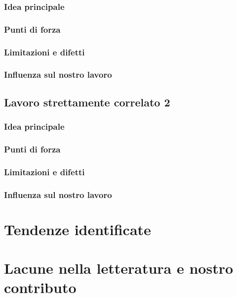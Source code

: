 \subsubsection{Idea principale}
\subsubsection{Punti di forza}
\subsubsection{Limitazioni e difetti}
\subsubsection{Influenza sul nostro lavoro}

\subsection{Lavoro strettamente correlato 2}
\subsubsection{Idea principale}
\subsubsection{Punti di forza}
\subsubsection{Limitazioni e difetti}
\subsubsection{Influenza sul nostro lavoro}

\section{Tendenze identificate}


\section{Lacune nella letteratura e nostro contributo}

